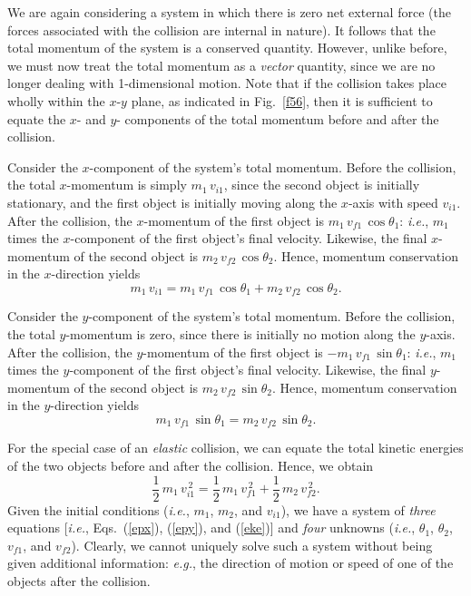 We are again considering a system in which there is zero net external force (the forces associated
with the collision are internal in nature). It follows that the total momentum of
the system is a conserved quantity. However, unlike before, we must now treat the total
momentum as a {\em vector} quantity, since we are no longer dealing with 1-dimensional
motion. Note that if the collision takes place wholly within the $x$-$y$ plane, as indicated in Fig.~\ref{f56},
then it is sufficient to equate the $x$- and $y$- components of the total momentum before and after the collision. 

Consider the $x$-component of the system's total momentum. Before the collision, the
total $x$-momentum is simply $m_1\,v_{i1}$, since the second object is initially
stationary, and the first object is initially moving along the $x$-axis with
speed $v_{i1}$. After the collision, the $x$-momentum of the first object is
$m_1\,v_{f1}\,\cos\theta_1$: {\em i.e.}, $m_1$ times the $x$-component of the
first object's final velocity. Likewise, the final $x$-momentum of the second
object is $m_2\,v_{f2}\,\cos\theta_2$. Hence, momentum conservation in the $x$-direction
yields
\begin{equation}\label{epx}
m_1\,v_{i1} = m_1\,v_{f1}\,\cos\theta_1+ m_2\,v_{f2}\,\cos\theta_2.
\end{equation}

Consider the $y$-component of the system's total momentum. Before the collision, the
total $y$-momentum is zero, since there is initially no  motion along the $y$-axis.
After the collision, the $y$-momentum of the first object is
$-m_1\,v_{f1}\,\sin\theta_1$: {\em i.e.}, $m_1$ times the $y$-component of the
first object's final velocity. Likewise, the final $y$-momentum of the second
object is $m_2\,v_{f2}\,\sin\theta_2$. Hence, momentum conservation in the $y$-direction
yields
\begin{equation}\label{epy}
  m_1\,v_{f1}\,\sin\theta_1= m_2\,v_{f2}\,\sin\theta_2.
\end{equation}

For the special case of an {\em elastic} collision, we can equate the
total kinetic energies of the two objects before and after the collision. Hence,
we obtain
\begin{equation}\label{eke}
 \frac{1}{2}\,m_1\,v_{i1}^{\,2} =\frac{1}{2}\,m_1\,v_{f1}^{\,2}+\frac{1}{2}\,m_2\,v_{f2}^{\,2}. 
\end{equation}
Given the initial conditions ({\em i.e.}, $m_1$, $m_2$, and $v_{i1}$), we have a system
of {\em  three} equations [{\em i.e.}, Eqs.~(\ref{epx}), (\ref{epy}), and (\ref{eke})] and
{\em four} unknowns ({\em i.e.}, $\theta_1$, $\theta_2$, $v_{f1}$, and $v_{f2}$). Clearly,
we cannot uniquely  solve such a system without being given additional information:
{\em e.g.}, the direction of motion or speed of one of the objects after the collision.

